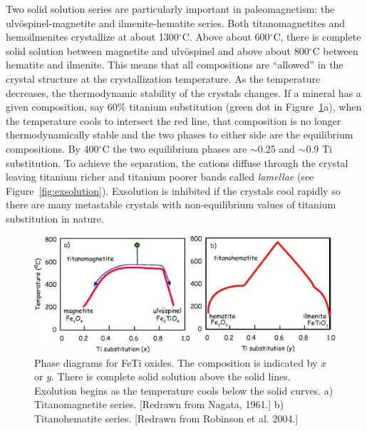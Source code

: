  Two solid solution series are particularly important in paleomagnetism: the
ulv\" ospinel-magnetite and ilmenite-hematite series.    Both titanomagnetites and hemoilmenites crystallize at about 1300$^{\circ}$C.   
 Above about 600$^{\circ}$C, there is complete solid solution between magnetite and ulv\"ospinel and above about 800$^{\circ}$C between hematite and ilmenite.   This means that all compositions are ``allowed'' in the crystal structure at the crystallization temperature.  As the temperature decreases, the thermodynamic stability of the crystals changes.   If a mineral has a given composition, say 60\% titanium substitution (green dot in Figure~\ref{fig:solidsolution}a), when the temperature cools to intersect the red line, that composition is no longer thermodynamically stable and the two phases to either side are the equilibrium compositions.   By 400$^{\circ}$C the two equilibrium phases are $\sim$0.25 and $\sim$0.9 Ti substitution.   To achieve the separation, the  cations diffuse through the crystal leaving titanium richer and titanium poorer bands called {\it lamellae}  (see Figure~\ref{fig:exsolution}).   Exsolution is inhibited if the crystals cool rapidly so there are many metastable crystals with non-equilibrium values of titanium substitution in nature.
 
\begin{figure}[htb]
\centering  \includegraphics[width=13 cm]{EPSfiles/solidsolution.eps}
\caption{Phase diagrams for FeTi oxides.  The composition is indicated by $x$ or $y$. 
There is complete solid solution above the solid lines.  Exolution begins as the temperature cools below the solid curves.  a) Titanomagnetite series. [Redrawn from Nagata, 1961.] b) Titanohematite series.  [Redrawn from Robinson et al. 2004.]}
\label{fig:solidsolution}
\end{figure}
 \nocite{robinson04} \nocite{nagata61}


